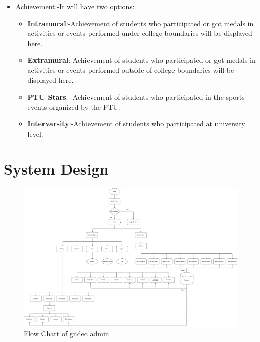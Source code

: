 \begin{itemize}
\begin{itemize}
			\item{Achievement}:-It will have two options:
			\begin{itemize} 
			\item \textbf{Intramural}:-Achievement of students who participated or got medals in activities or events performed under college boundaries will be displayed here.
			\item \textbf{Extramural}:-Achievement of students who participated or got medals in activities or events performed outside of college boundaries will be displayed here.
			\item \textbf{PTU Stars}:- Achievement of students who participated in the sports events organized by the PTU.
			  \item \textbf{Intervarsity}:-Achievement of students who participated at university level.
			
			
			\end{itemize}
			
			
		\end{itemize}
	\end{itemize}
\newpage
\section{System Design}

\begin{figure}[ht]
	
	\includegraphics[scale=0.26]{images/Gndecadmingne.png}
	\caption{Flow Chart of gndec admin}
\end{figure}

